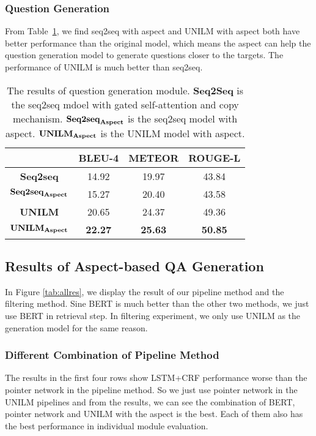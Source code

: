 \subsubsection{Question Generation}

From Table~\ref{tab:QG}, we find seq2seq with aspect and UNILM with aspect both have better performance than the original model, which means the aspect can help the question generation model to generate questions closer to the targets. 
The performance of UNILM is much better than seq2seq.

\begin{table}[th]
\small
\centering
\begin{tabular}{cccc}
\hline
\textbf{} & \textbf{BLEU-4} & \textbf{METEOR} & \textbf{ROUGE-L} \\ \hline\hline
\textbf{Seq2seq} & 14.92 & 19.97 & 43.84 \\ 
$\text{\textbf{Seq2seq}}_{\text{\textbf{Aspect}}}$ & 15.27 & 20.40 & 43.58 \\ \hline
\textbf{UNILM} & 20.65 & 24.37 & 49.36 \\ 
$\text{\textbf{UNILM}}_{\text{\textbf{Aspect}}}$ & \textbf{22.27} & \textbf{25.63} & \textbf{50.85} \\ \hline
\end{tabular}
\caption{\label{tab:QG} The results of question generation module. \textbf{Seq2Seq} is the seq2seq mdoel with gated self-attention and copy mechanism. $\text{\textbf{Seq2seq}}_{\text{\textbf{Aspect}}}$ is the seq2seq model with aspect. $\text{\textbf{UNILM}}_{\text{\textbf{Aspect}}}$ is the UNILM model with aspect.}
\end{table}


\subsection{Results of Aspect-based QA Generation}
In Figure \ref{tab:allres}, we display the result of our pipeline method and the filtering method. Sine BERT is much better than the other two methods, we just use BERT in retrieval step. In filtering experiment, we only use UNILM as the generation model for the same reason.
\subsubsection{Different Combination of Pipeline Method}
The results in the first four rows show LSTM+CRF performance worse than the pointer network in the pipeline method. So we just use pointer network in the UNILM pipelines and from the results, we can see the combination of BERT, pointer network and UNILM with the aspect is the best. Each of them also has the best performance in individual module evaluation.


